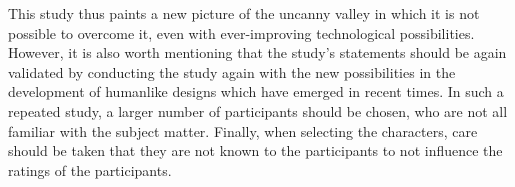 This study thus paints a new picture of the uncanny valley in which it is not possible to overcome it, even with ever-improving technological possibilities. However, it is also worth mentioning that the study's statements should be again validated by conducting the study again with the new possibilities in the development of humanlike designs which have emerged in recent times. In such a repeated study, a larger number of participants should be chosen, who are not all familiar with the subject matter. Finally, when selecting the characters, care should be taken that they are not known to the participants to not influence the ratings of the participants.







